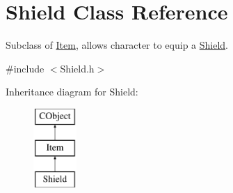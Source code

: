 \hypertarget{class_shield}{}\section{Shield Class Reference}
\label{class_shield}


Subclass of \hyperlink{class_item}{Item}, allows character to equip a \hyperlink{class_shield}{Shield}.  




{\ttfamily \#include $<$Shield.\+h$>$}

Inheritance diagram for Shield\+:\begin{figure}[H]
\begin{center}
\leavevmode
\includegraphics[height=3.000000cm]{class_shield}
\end{center}
\end{figure}
